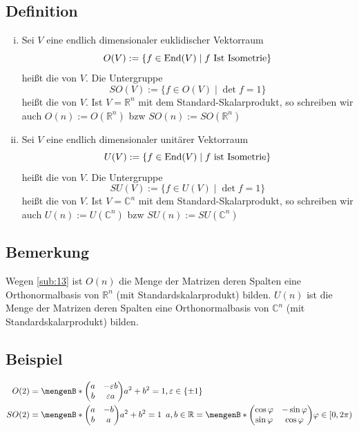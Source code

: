 \subsection[Definition orthogonale/unitäre Gruppe]{Definition} %
\label{sub:definition17}
\begin{enumerate}[(i)]
	\item Sei $V$ eine endlich dimensionaler euklidischer Vektorraum
	\[
		O(V) := \{ f \in \operatorname{End}(V) \mid f \text{ Ist Isometrie} \}
	\]
	heißt die  von $V$. Die Untergruppe 
	\[
		SO(V) := \{ f \in O(V) \mid \det f = 1 \}
	\] 
	heißt die  von $V$. Ist $V=\mathds{R}^n$ mit dem Standard-Skalarprodukt, so schreiben wir auch $O(n):= O(\mathds{R}^n)$ bzw
	$SO(n) := SO(\mathds{R}^n)$
	\item Sei $V$ eine endlich dimensionaler unitärer Vektorraum
	\[
		U(V) := \{ f \in \operatorname{End}(V) \mid f \text{ ist Isometrie} \}
	\]
	heißt die  von $V$. Die Untergruppe 
	\[
		SU(V) := \{ f \in U(V) \mid \det f = 1 \}
	\] 
	heißt die  von $V$. Ist $V=\mathds{C}^n$ mit dem Standard-Skalarprodukt, so schreiben wir auch $U(n):= U(\mathds{C}^n)$ bzw
	$SU(n) := SU(\mathds{C}^n)$
\end{enumerate}

\subsection[Bemerkung über die Spalten der Matrizen in $O(n)$]{Bemerkung} %
\label{sub:18}
Wegen \ref{sub:13} ist $O(n)$ die Menge der Matrizen deren Spalten eine Orthonormalbasis von $\mathds{R}^n$ (mit Standardskalarprodukt) bilden. $U(n)$ ist die Menge der
Matrizen deren Spalten eine Orthonormalbasis von $\mathds{C}^n$ (mit Standardskalarprodukt) bilden.

\subsection[Beispiel für (spezielle) orthogonale Gruppen]{Beispiel} %
\label{sub:19}
\begin{align*}
	O(2) &= {\set[\begin{pmatrix} a & - \varepsilon b \\ b & \varepsilon a \end{pmatrix}]{a^2 + b^2 =1 , \varepsilon \in \{ \pm 1 \}} }\\
	SO(2) &= {\set[\begin{pmatrix} a & -  b \\ b &  a \end{pmatrix}]{a^2 + b^2 = 1 \enspace a,b \in \mathds{R}} = \set[\begin{pmatrix} \cos \varphi & - \sin \varphi \\ \sin \varphi & \cos \varphi \end{pmatrix}]{\varphi \in [0, 2 \pi )}}
\end{align*}

